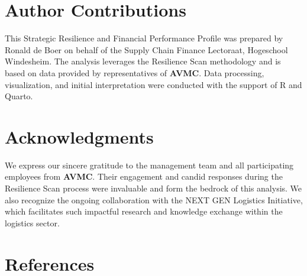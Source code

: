 \documentclass[
  oneside,
  open=any,
  fontsize=11pt]{scrbook}
\begin{document}
\chapter{Author Contributions}\label{author-contributions}

This Strategic Resilience and Financial Performance Profile was prepared
by Ronald de Boer on behalf of the Supply Chain Finance Lectoraat,
Hogeschool Windesheim. The analysis leverages the Resilience Scan
methodology and is based on data provided by representatives of
\textbf{AVMC}. Data processing, visualization, and initial
interpretation were conducted with the support of R and Quarto.

\chapter{Acknowledgments}\label{acknowledgments}

We express our sincere gratitude to the management team and all
participating employees from \textbf{AVMC}. Their engagement and candid
responses during the Resilience Scan process were invaluable and form
the bedrock of this analysis. We also recognize the ongoing
collaboration with the NEXT GEN Logistics Initiative, which facilitates
such impactful research and knowledge exchange within the logistics
sector.

\chapter{References}\label{references}

\label{refs}


\backmatter
\end{document}
